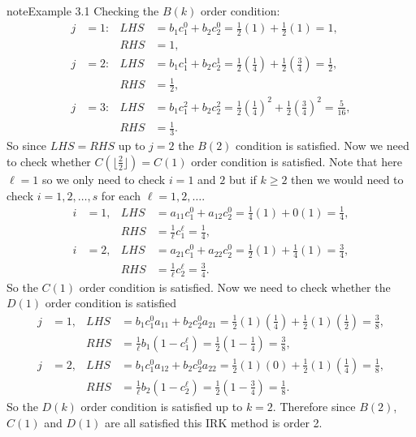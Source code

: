 \documentclass[letterpaper,10pt,english]{jupyterBook}
\begin{document}
\begin{sphinxadmonition}{note}{Example 3.1}
\sphinxAtStartPar
Checking the \(B(k)\) order condition:
\begin{align*}
  j &=1: & LHS &= b_1 c_1^0 + b_2 c_2^0 = \frac{1}{2}(1)+\frac{1}{2}(1)=1, \\
  && RHS &= 1,\\
  j &=2: & LHS &= b_1 c_1^1 + b_2 c_2^1 = \frac{1}{2}\left(\frac{1}{4}\right)+\frac{1}{2}\left(\frac{3}{4}\right)=\frac{1}{2}, \\
  && RHS &= \frac{1}{2},\\
  j &=3: & LHS &= b_1 c_1^2 + b_2 c_2^2 = \frac{1}{2}{\left(\frac{1}{4}\right)}^2 +\frac{1}{2}{\left(\frac{3}{4}\right)}^2 = \frac{5}{16}, \\
  && RHS &= \frac{1}{3}.
\end{align*}
\sphinxAtStartPar
So since \(LHS=RHS\) up to \(j=2\) the \(B(2)\) condition is satisfied. Now we need to check whether \(C(\lfloor \frac{2}{2} \rfloor)=C(1)\) order condition is satisfied. Note that here \(\ell=1\) so we only need to check \(i = 1\) and \(2\) but if \(k \geq 2\) then we would need to check \(i = 1, 2, \ldots, s\) for each \(\ell = 1, 2, \ldots\).
\begin{align*}
  i &= 1, & LHS&=a_{11} c_1^0 + a_{12} c_2^0 =\frac{1}{4}(1)+0(1)=\frac{1}{4}, \\
  && RHS &= \frac{1}{\ell}c_1^{\ell} =\frac{1}{4},\\
  i &= 2, & LHS&=a_{21} c_1^0 + a_{22} c_2^0 =\frac{1}{2}(1)+\frac{1}{4}(1)=\frac{3}{4}, \\
  && RHS &= \frac{1}{\ell}c_2^{\ell} =\frac{3}{4}.
\end{align*}
\sphinxAtStartPar
So the \(C(1)\) order condition is satisfied. Now we need to check whether the \(D(1)\) order condition is satisfied
\begin{align*}
  j &= 1, & LHS &= b_1 c_1^0 a_{11} +b_2 c_2^0 a_{21} =\frac{1}{2}(1)\left(\frac{1}{4}\right)+\frac{1}{2}(1)\left(\frac{1}{2}\right)=\frac{3}{8},\\
  && RHS &= \frac{1}{\ell}b_1 (1-c_1^{\ell})=\frac{1}{2}\left(1-\frac{1}{4}\right)=\frac{3}{8},\\
  j&=2, & LHS&=b_1 c_1^0 a_{12} +b_2 c_2^0 a_{22} =\frac{1}{2}(1)(0)+\frac{1}{2}(1)\left(\frac{1}{4}\right)=\frac{1}{8},\\
  && RHS&=\frac{1}{\ell }b_2 (1 - c_2^{\ell})=\frac{1}{2}\left(1-\frac{3}{4}\right)=\frac{1}{8}.
\end{align*}
\sphinxAtStartPar
So the \(D(k)\) order condition is satisfied up to \(k=2\). Therefore since \(B(2)\), \(C(1)\) and \(D(1)\) are all satisfied this IRK method is order 2.
\end{sphinxadmonition}
\end{document}
